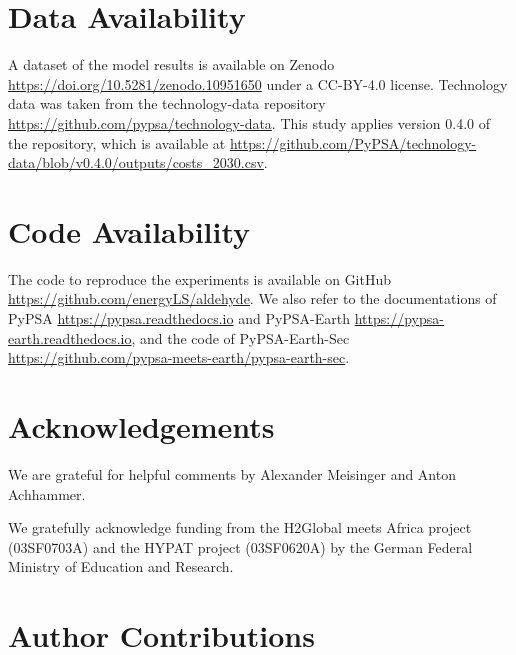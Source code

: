 \documentclass[5p,numafflabel]{elsarticle}
\begin{document}




\section*{Data Availability}
A dataset of the model results is available on Zenodo \href{https://doi.org/10.5281/zenodo.10951650}{https://doi.org/10.5281/zenodo.10951650} under a CC-BY-4.0 license. 
Technology data was taken from the technology-data repository \href{https://github.com/pypsa/technology-data}{https://github.com/pypsa/technology-data}. 
This study applies version 0.4.0 of the repository, which is available at \href{https://github.com/PyPSA/technology-data/blob/v0.4.0/outputs/costs_2030.csv}{https://github.com/PyPSA/technology-data/blob/v0.4.0/outputs/costs\_2030.csv}.

\section*{Code Availability}
The code to reproduce the experiments is available on GitHub \href{https://github.com/energyLS/aldehyde}{https://github.com/energyLS/aldehyde}.
We also refer to the documentations of PyPSA \href{https://pypsa.readthedocs.io}{https://pypsa.readthedocs.io} and PyPSA-Earth \href{https://pypsa-earth.readthedocs.io}{https://pypsa-earth.readthedocs.io}, and the code of PyPSA-Earth-Sec
\href{https://github.com/pypsa-meets-earth/pypsa-earth-sec}{https://github.com/pypsa-meets-earth/pypsa-earth-sec}.



\renewcommand{\ttdefault}{\sfdefault}



\section*{Acknowledgements}

We are grateful for helpful comments by Alexander Meisinger and Anton Achhammer.

We gratefully acknowledge funding from the H2Global meets Africa project (03SF0703A) and the HYPAT project (03SF0620A) by the German Federal Ministry of Education and Research.



\section*{Author Contributions}
\end{document}
